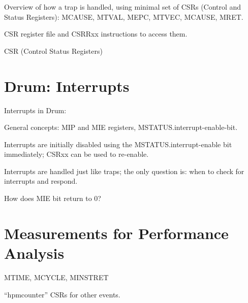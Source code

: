 Overview of how a trap is handled, using minimal set of CSRs (Control
and Status Registers): MCAUSE, MTVAL, MEPC, MTVEC, MCAUSE, MRET.

CSR register file and CSRRxx instructions to access them.

CSR (Control Status Registers)


\section{Drum: Interrupts}

Interrupts in Drum:
\begin{tightlist}
  \item General concepts: MIP and MIE registers, MSTATUS.interrupt-enable-bit.

  \item Interrupts are initially disabled using the
        MSTATUS.interrupt-enable bit immediately; CSRxx can be used to
        re-enable.

  \item Interrupts are handled just like traps; the only question is:
        when to check for interrupts and respond.

  \item How does MIE bit return to 0?

\end{tightlist}


\section{Measurements for Performance Analysis}

MTIME, MCYCLE, MINSTRET

``hpmcounter'' CSRs for other events.

